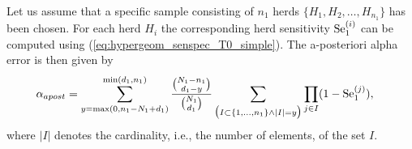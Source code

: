 \documentclass[nojss]{jss}
\begin{document}
Let us assume that a specific sample consisting of $n_1$ herds $\{H_1, H_2,\ldots, H_{n_1}\}$ has been chosen. For each herd $H_i$ the corresponding herd sensitivity $\mbox{Se}_1^{(i)}$ can be computed using (\ref{eq:hypergeom_senspec_T0_simple}). The a-posteriori alpha error is then given by
%
\begin{equation}\label{eq:apost_alpha_exact}
\begin{aligned}
%
\alpha_{apost} &= \sum_{y = \max(0,n_1-N_1+d_1)}^{\min(d_1,n_1)} \frac{{N_1-n_1 \choose d_1-y}}{{N_1 \choose d_1}} \sum_{\big(I\subset \{1,\ldots, n_1\} \wedge |I| = y\big)} \prod_{j\in I} (1-\Se_1^{(j)}),
%
\end{aligned}
\end{equation}
%
where $|I|$ denotes the cardinality, i.e., the number of elements, of the set $I$.
\end{document}
